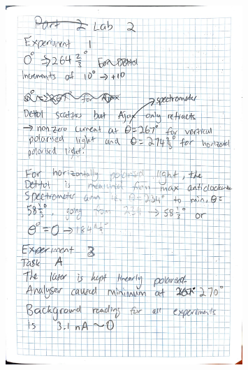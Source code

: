\documentclass{article}
\begin{document}
\begin{figure}[H]
    \centering
    \includegraphics[width=0.8\textwidth]{labbook4.jpg}
\end{figure}
\end{document}

